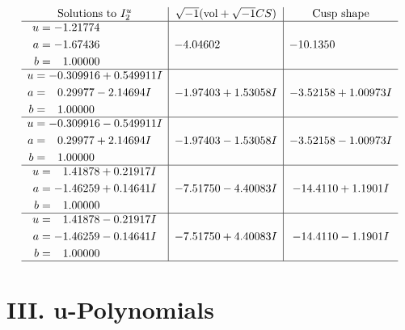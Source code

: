 \documentclass[1p]{elsarticle_modified}
\theoremstyle{definition}
\newcommand{\I}{\sqrt{-1}}
\begin{document}
$$\begin{array}{c|c|c}  
\text{Solutions to }I^u_{2}& \I (\text{vol} + \sqrt{-1}CS) & \text{Cusp shape}\\
 \hline 
\begin{aligned}
u &= -1.21774\phantom{ +0.000000I} \\
a &= -1.67436\phantom{ +0.000000I} \\
b &= \phantom{-}1.00000\phantom{ +0.000000I}\end{aligned}
 & -4.04602\phantom{ +0.000000I} & -10.1350\phantom{ +0.000000I} \\ \hline\begin{aligned}
u &= -0.309916 + 0.549911 I \\
a &= \phantom{-}0.29977 - 2.14694 I \\
b &= \phantom{-}1.00000\phantom{ +0.000000I}\end{aligned}
 & -1.97403 + 1.53058 I & -3.52158 + 1.00973 I \\ \hline\begin{aligned}
u &= -0.309916 - 0.549911 I \\
a &= \phantom{-}0.29977 + 2.14694 I \\
b &= \phantom{-}1.00000\phantom{ +0.000000I}\end{aligned}
 & -1.97403 - 1.53058 I & -3.52158 - 1.00973 I \\ \hline\begin{aligned}
u &= \phantom{-}1.41878 + 0.21917 I \\
a &= -1.46259 + 0.14641 I \\
b &= \phantom{-}1.00000\phantom{ +0.000000I}\end{aligned}
 & -7.51750 - 4.40083 I & -14.4110 + 1.1901 I \\ \hline\begin{aligned}
u &= \phantom{-}1.41878 - 0.21917 I \\
a &= -1.46259 - 0.14641 I \\
b &= \phantom{-}1.00000\phantom{ +0.000000I}\end{aligned}
 & -7.51750 + 4.40083 I & -14.4110 - 1.1901 I\\
 \hline 
 \end{array}$$\newpage
\newpage\renewcommand{\arraystretch}{1}
\centering \section*{ III. u-Polynomials}
\end{document}
